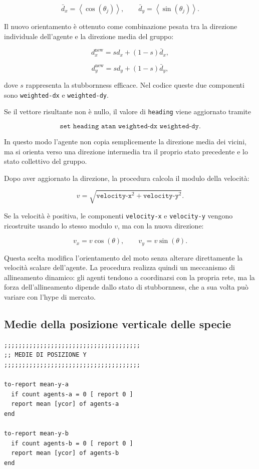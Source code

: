 \[
\bar{d}_x = \left\langle \cos(\theta_j) \right\rangle,
\qquad
\bar{d}_y = \left\langle \sin(\theta_j) \right\rangle.
\]

Il nuovo orientamento è ottenuto come combinazione pesata tra la direzione
individuale dell'agente e la direzione media del gruppo:

\[
d_x^{\mathrm{new}}
=
s d_x
+
(1-s)\bar{d}_x,
\]

\[
d_y^{\mathrm{new}}
=
s d_y
+
(1-s)\bar{d}_y,
\]

dove \(s\) rappresenta la stubbornness efficace. Nel codice queste due componenti
sono \texttt{weighted-dx} e \texttt{weighted-dy}.

Se il vettore risultante non è nullo, il valore di \texttt{heading} viene
aggiornato tramite

\[
\texttt{set heading atan weighted-dx weighted-dy}.
\]

In questo modo l'agente non copia semplicemente la direzione media dei vicini,
ma si orienta verso una direzione intermedia tra il proprio stato precedente e lo
stato collettivo del gruppo.

Dopo aver aggiornato la direzione, la procedura calcola il modulo della velocità:

\[
v =
\sqrt{
\texttt{velocity-x}^2
+
\texttt{velocity-y}^2
}.
\]

Se la velocità è positiva, le componenti \texttt{velocity-x} e
\texttt{velocity-y} vengono ricostruite usando lo stesso modulo \(v\), ma con la
nuova direzione:

\[
v_x = v\cos(\theta),
\qquad
v_y = v\sin(\theta).
\]

Questa scelta modifica l'orientamento del moto senza alterare direttamente la
velocità scalare dell'agente. La procedura realizza quindi un meccanismo di
allineamento dinamico: gli agenti tendono a coordinarsi con la propria rete, ma
la forza dell'allineamento dipende dallo stato di stubbornness, che a sua volta
può variare con l'hype di mercato.

\subsection{Medie della posizione verticale delle specie}

\begin{lstlisting}[caption={Reporter per la posizione media lungo l'asse \(y\) delle specie A e B}]
;;;;;;;;;;;;;;;;;;;;;;;;;;;;;;;;;;;;;;
;; MEDIE DI POSIZIONE Y
;;;;;;;;;;;;;;;;;;;;;;;;;;;;;;;;;;;;;;

to-report mean-y-a
  if count agents-a = 0 [ report 0 ]
  report mean [ycor] of agents-a
end

to-report mean-y-b
  if count agents-b = 0 [ report 0 ]
  report mean [ycor] of agents-b
end
\end{lstlisting}

